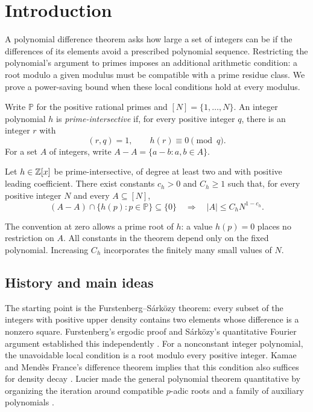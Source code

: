 \section{Introduction}\label{sec:introduction}

A polynomial difference theorem asks how large a set of integers can be
if the differences of its elements avoid a prescribed polynomial
sequence. Restricting the polynomial's argument to primes imposes an
additional arithmetic condition: a root modulo a given modulus must
be compatible with a prime residue class. We prove a power-saving bound
when these local conditions hold at every modulus.

Write $\mathbb P$ for the positive rational primes and
$[N]=\{1,\ldots,N\}$. An integer polynomial $h$ is
\emph{prime-intersective} if, for every positive integer $q$, there is
an integer $r$ with
\[
 (r,q)=1,\qquad h(r)\equiv0\pmod q.
\]
For a set $A$ of integers, write $A-A=\{a-b:a,b\in A\}$.

\begin{theorem}\label{thm:main}
Let $h\in\mathbb Z[x]$ be prime-intersective, of degree at least two and with
positive leading coefficient. There exist constants $c_h>0$ and
$C_h\ge1$ such that, for every positive integer $N$ and every
$A\subseteq[N]$,
\[
 (A-A)\cap\{h(p):p\in\mathbb P\}\subseteq\{0\}
 \quad\Longrightarrow\quad
 |A|\le C_h N^{1-c_h}.
\]
\end{theorem}

The convention at zero allows a prime root of $h$: a value $h(p)=0$
places no restriction on $A$. All constants in the theorem depend only
on the fixed polynomial. Increasing $C_h$ incorporates the finitely
many small values of $N$.

\subsection{History and main ideas}

The starting point is the Furstenberg--S\'ark\"ozy theorem: every subset
of the integers with positive upper density contains two elements whose
difference is a nonzero square. Furstenberg's ergodic proof and
S\'ark\"ozy's quantitative Fourier argument established this independently
\cite{Furstenberg1977,Sarkozy1978}. For a nonconstant integer polynomial,
the unavoidable local condition is a root modulo every positive integer.
Kamae and Mend\`es France's difference theorem implies that this
condition also suffices for density decay
\cite{KamaeMendesFrance1978}. Lucier made the general polynomial theorem
quantitative by organizing the iteration around compatible $p$-adic
roots and a family of auxiliary polynomials \cite{Lucier2006}.

